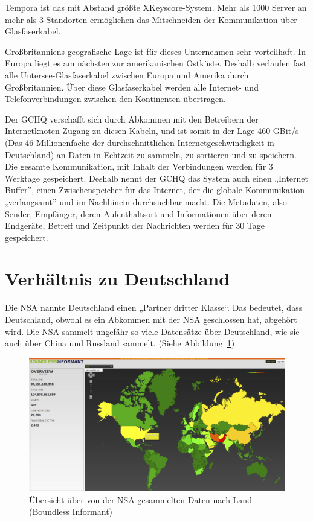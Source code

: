 \documentclass[12pt,a4paper]{scrartcl}
\begin{document}
Tempora ist das mit Abstand größte XKeyscore-System. Mehr als 1000 Server an mehr als 3 Standorten ermöglichen das Mitschneiden der Kommunikation über Glasfaserkabel.

Großbritanniens geografische Lage ist für dieses Unternehmen sehr vorteilhaft. In Europa liegt es am nächsten zur amerikanischen Ostküste. Deshalb verlaufen fast alle Untersee-Glasfaserkabel zwischen Europa und Amerika durch Großbritannien. Über diese Glasfaserkabel werden alle Internet- und Telefonverbindungen zwischen den Kontinenten übertragen.

Der GCHQ verschafft sich durch Abkommen mit den Betreibern der Internetknoten Zugang zu diesen Kabeln, und ist somit in der Lage 460 GBit/s (Das 46 Millionenfache der durchschnittlichen Internetgeschwindigkeit in Deutschland\cite{statista_internet}) an Daten in Echtzeit zu sammeln, zu sortieren und zu speichern. Die gesamte Kommunikation, mit Inhalt der Verbindungen werden für 3 Werktage gespeichert. Deshalb nennt der GCHQ das System auch einen „Internet Buffer”, einen Zwischenspeicher für das Internet, der die globale Kommunikation „verlangsamt” und im Nachhinein durchsuchbar macht. Die Metadaten, also Sender, Empfänger, deren Aufenthaltsort und Informationen über deren Endgeräte, Betreff und Zeitpunkt der Nachrichten werden für 30 Tage gespeichert.

\section{Verhältnis zu Deutschland}
Die NSA nannte Deutschland einen „Partner dritter Klasse“. Das bedeutet, dass Deutschland, obwohl es ein Abkommen mit der NSA geschlossen hat, abgehört wird. Die NSA sammelt ungefähr so viele Datensätze über Deutschland, wie sie auch über China und Russland sammelt. (Siehe Abbildung~\ref{fig:boundless_informant})

\begin{figure}[H]
\centering
\includegraphics[width=\textwidth]{images/bi.png}
\caption{Übersicht über von der NSA gesammelten Daten nach Land (Boundless Informant)}
\label{fig:boundless_informant}
\end{figure}
\end{document}
